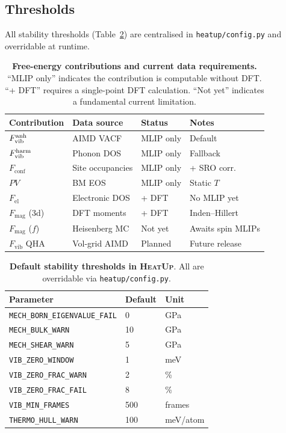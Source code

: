 \documentclass[twocolumn,10pt]{article}
\newcommand{\Fvib}{F_{\mathrm{vib}}}
\newcommand{\Fel}{F_{\mathrm{el}}}
\newcommand{\Fmag}{F_{\mathrm{mag}}}
\newcommand{\Fconf}{F_{\mathrm{conf}}}
\newcommand{\tp}{\textsc{HeatUp}}
\begin{document}
\subsection*{Thresholds}

All stability thresholds (Table~\ref{tab:thresholds}) are centralised in
\texttt{heatup/config.py} and overridable at runtime.


\begin{table}[ht]
\caption{\textbf{Free-energy contributions and current data requirements.}
  ``MLIP only'' indicates the contribution is computable without DFT.
  ``+ DFT'' requires a single-point DFT calculation.
  ``Not yet'' indicates a fundamental current limitation.}
\label{tab:contributions}
\small
\begin{tabular}{lllp{2.8cm}}
\toprule
Contribution & Data source & Status & Notes \\
\midrule
$\Fvib^{\rm anh}$ & AIMD VACF & MLIP only & Default \\
$\Fvib^{\rm harm}$ & Phonon DOS & MLIP only & Fallback \\
$\Fconf$ & Site occupancies & MLIP only & + SRO corr. \\
$PV$ & BM EOS & MLIP only & Static $T$ \\
$\Fel$ & Electronic DOS & + DFT & No MLIP yet \\
$\Fmag$ (3d) & DFT moments & + DFT & Inden--Hillert \\
$\Fmag$ ($f$) & Heisenberg MC & Not yet & Awaits spin MLIPs \\
$\Fvib$ QHA & Vol-grid AIMD & Planned & Future release \\
\bottomrule
\end{tabular}
\end{table}

\begin{table}[ht]
\caption{\textbf{Default stability thresholds in \tp{}}.
  All are overridable via \texttt{heatup/config.py}.}
\label{tab:thresholds}
\small
\begin{tabular}{lll}
\toprule
Parameter & Default & Unit \\
\midrule
\texttt{MECH\_BORN\_EIGENVALUE\_FAIL} & 0 & GPa \\
\texttt{MECH\_BULK\_WARN} & 10 & GPa \\
\texttt{MECH\_SHEAR\_WARN} & 5 & GPa \\
\texttt{VIB\_ZERO\_WINDOW} & 1 & meV \\
\texttt{VIB\_ZERO\_FRAC\_WARN} & 2 & \% \\
\texttt{VIB\_ZERO\_FRAC\_FAIL} & 8 & \% \\
\texttt{VIB\_MIN\_FRAMES} & 500 & frames \\
\texttt{THERMO\_HULL\_WARN} & 100 & meV/atom \\
\bottomrule
\end{tabular}
\end{table}
\end{document}
